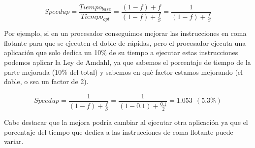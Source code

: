 \documentclass[12pt,onecolumn]{memoir}
\begin{document}
\[ Speedup = \frac{Tiempo_{base}}{Tiempo_{opt}} = \frac{(1 - f) +
  f}{(1 - f) + \frac{f}{S}} = \frac{1}{(1 - f) + \frac{f}{S}} \]

\begin{center}
\end{center}
  
Por ejemplo, si en un procesador conseguimos mejorar las instrucciones en coma flotante para
que se ejecuten el doble de rápidas,
pero el procesador ejecuta una aplicación que solo dedica un 10\% de su tiempo a ejecutar estas
instrucciones podemos aplicar la Ley de Amdahl, ya que sabemos el
porcentaje de tiempo de la parte mejorada (10\% del total) y sabemos
en qué factor estamos mejorando (el doble, o sea un factor de 2).

\[ Speedup = \frac{1}{(1 - f) + \frac{f}{S}} = \frac{1}{(1 - 0.1) +
  \frac{0.1}{2}} = 1.053 ~ ~ (5.3\%) \]

Cabe destacar que la mejora podría cambiar al ejecutar otra aplicación
ya que el porcentaje del tiempo que dedica a las instrucciones de coma
flotante puede variar.
\end{document}
